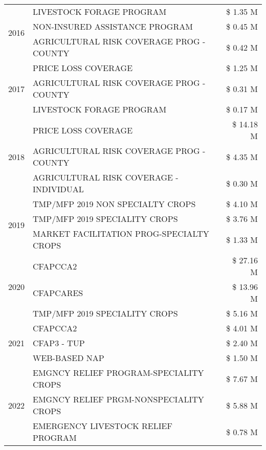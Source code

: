 \begin{tabular}{llr}
\cline{1-3}
\multirow[t]{3}{*}{2016} & LIVESTOCK FORAGE PROGRAM & \$ 1.35 M \\
 & NON-INSURED ASSISTANCE PROGRAM & \$ 0.45 M \\
 & AGRICULTURAL RISK COVERAGE PROG - COUNTY & \$ 0.42 M \\
\cline{1-3}
\multirow[t]{3}{*}{2017} & PRICE LOSS COVERAGE & \$ 1.25 M \\
 & AGRICULTURAL RISK COVERAGE PROG - COUNTY & \$ 0.31 M \\
 & LIVESTOCK FORAGE PROGRAM & \$ 0.17 M \\
\cline{1-3}
\multirow[t]{3}{*}{2018} & PRICE LOSS COVERAGE & \$ 14.18 M \\
 & AGRICULTURAL RISK COVERAGE PROG - COUNTY & \$ 4.35 M \\
 & AGRICULTURAL RISK COVERAGE - INDIVIDUAL & \$ 0.30 M \\
\cline{1-3}
\multirow[t]{3}{*}{2019} & TMP/MFP 2019 NON SPECIALTY CROPS & \$ 4.10 M \\
 & TMP/MFP 2019 SPECIALITY CROPS & \$ 3.76 M \\
 & MARKET FACILITATION PROG-SPECIALTY CROPS & \$ 1.33 M \\
\cline{1-3}
\multirow[t]{3}{*}{2020} & CFAPCCA2 & \$ 27.16 M \\
 & CFAPCARES & \$ 13.96 M \\
 & TMP/MFP 2019 SPECIALITY CROPS & \$ 5.16 M \\
\cline{1-3}
\multirow[t]{3}{*}{2021} & CFAPCCA2 & \$ 4.01 M \\
 & CFAP3 - TUP & \$ 2.40 M \\
 & WEB-BASED NAP & \$ 1.50 M \\
\cline{1-3}
\multirow[t]{3}{*}{2022} & EMGNCY RELIEF PROGRAM-SPECIALITY CROPS & \$ 7.67 M \\
 & EMGNCY RELIEF PRGM-NONSPECIALITY CROPS & \$ 5.88 M \\
 & EMERGENCY LIVESTOCK RELIEF PROGRAM & \$ 0.78 M \\
\cline{1-3}
\bottomrule
\end{tabular}
